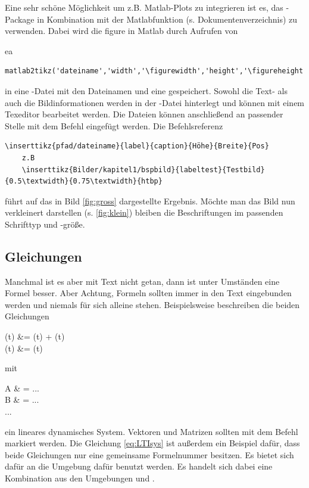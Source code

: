 Eine sehr schöne Möglichkeit um z.B. Matlab-Plots zu integrieren ist es, das -Package in Kombination mit der Matlabfunktion  (s. Dokumentenverzeichnis) zu verwenden. Dabei wird die figure in Matlab durch Aufrufen von 

ea\begin{lstlisting}[style=Matlab-editor]
	matlab2tikz('dateiname','width','\figurewidth','height','\figureheight')
\end{lstlisting}
 in eine -Datei mit den Dateinamen  und eine gespeichert. Sowohl die Text- als auch die Bildinformationen werden in der -Datei hinterlegt und können mit einem Texeditor bearbeitet werden. Die Dateien können anschließend an passender Stelle mit dem Befehl  eingefügt werden. Die Befehlsreferenz
\begin{lstlisting}[style=myLatexStyle]
	\inserttikz{pfad/dateiname}{label}{caption}{Höhe}{Breite}{Pos}
	z.B 
	\inserttikz{Bilder/kapitel1/bspbild}{labeltest}{Testbild}{0.5\textwidth}{0.75\textwidth}{htbp}
\end{lstlisting}
führt auf das in Bild \ref{fig:gross} dargestellte Ergebnis. Möchte man das Bild nun verkleinert darstellen (s. \ref{fig:klein}) bleiben die Beschriftungen im passenden Schrifttyp und -größe.


\clearpage
\subsection{Gleichungen}
Manchmal ist es aber mit Text nicht getan, dann ist unter Umständen eine Formel besser. Aber Achtung, Formeln sollten immer in den Text eingebunden werden und niemals für sich alleine stehen. Beispielsweise beschreiben die beiden Gleichungen 
\begin{es}
\label{eq:LTIsys} 
(t) &= (t) + (t) \\
(t) &=  (t)
\end{es}

mit	\begin{es}
	A & = ...\\
	B & = ...\\
	...
	\end{es}
ein lineares dynamisches System. Vektoren und Matrizen sollten mit dem Befehl  markiert werden. Die Gleichung \eqref{eq:LTIsys} ist außerdem ein Beispiel dafür, dass beide Gleichungen nur eine gemeinsame Formelnummer besitzen. Es bietet sich dafür an die Umgebung  dafür benutzt werden. Es handelt sich dabei eine Kombination aus den Umgebungen  und .


